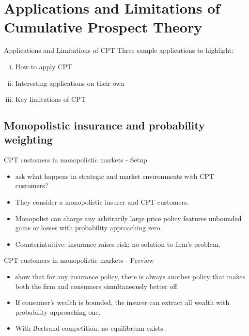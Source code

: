 \documentclass[11pt, aspectratio=169]{beamer}
\begin{document}
\section{Applications and Limitations of Cumulative Prospect Theory}



\begin{frame}{Applications and Limitations of CPT}
    Three sample applications to highlight:\bigskip
        \begin{enumerate}[i)]
            \item How to apply CPT\bigskip
            \item Interesting applications on their own\bigskip
            \item Key limitations of CPT\bigskip
        \end{enumerate}
    \end{frame}



\subsection{Monopolistic insurance and probability weighting}
    \begin{frame}{CPT customers in monopolistic markets - Setup}
        \begin{itemize}
            \item \citet{AzevedoGottlieb2012} ask what happens in strategic and market environments with CPT customers?\bigskip
            \item They consider a monopolistic insurer and CPT customers.\bigskip
                \item Monopolist can charge any arbitrarily large price policy features unbounded gains or losses with probability approaching zero.\bigskip
                \item Counterintuitive: insurance raises risk; no solution to firm's problem.\medskip
        \end{itemize}
    \end{frame}

    \begin{frame}{CPT customers in monopolistic markets - Preview}
        \begin{itemize}
            \item \citet{AzevedoGottlieb2012} show that for any insurance policy, there is always another policy that makes both the firm and consumers simultaneously better off.\bigskip
            \item If consumer's wealth is bounded, the insurer can extract all wealth with probability approaching one.\bigskip
            \item With Bertrand competition, no equilibrium exists.\bigskip
        \end{itemize}
    \end{frame}
\end{document}
